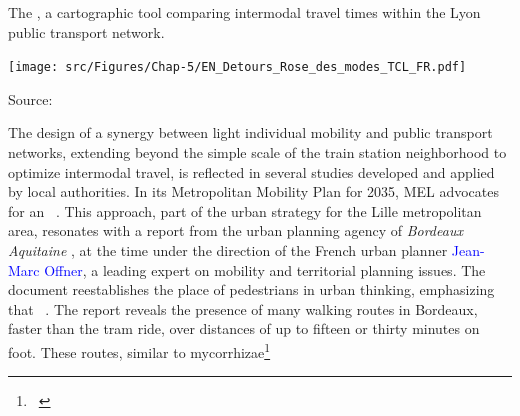 \begin{refsegment}
    \begin{carte}[h!]\vspace*{4pt}
        \caption{The , a cartographic tool comparing intermodal travel times within the Lyon public transport network.}
        \label{fig-chap5:rose-modes-reseau-tcl}
        \centerline{\texttt{[image: src/Figures/Chap-5/EN\_Detours\_Rose\_des\_modes\_TCL\_FR.pdf]}}
        \vspace{5pt}
        \begin{flushright}\scriptsize{
        Source: \textcolor{blue}{\textcite{tcl_transports_2023}}
        }\end{flushright}
    \end{carte}
    
The design of a synergy between light individual mobility and public transport networks, extending beyond the simple scale of the train station neighborhood to optimize intermodal travel, is reflected in several studies developed and applied by local authorities. In its Metropolitan Mobility Plan for 2035, \acrshort{MEL} advocates for an ~\textcolor{blue}{\autocite[328]{conseil_de_developpement_de_la_mel_plan_2022}}. This approach, part of the urban strategy for the Lille metropolitan area, resonates with a report from the urban planning agency of \textsl{Bordeaux Aquitaine} \textcolor{blue}{\textcite{aurba_itineraires_2017}}, at the time under the direction of the French urban planner \textcolor{blue}{Jean-Marc Offner}, a leading expert on mobility and territorial planning issues. The document reestablishes the place of pedestrians in urban thinking, emphasizing that ~\textcolor{blue}{\autocite[3, 14, 24]{aurba_itineraires_2017}}. The report reveals the presence of many walking routes in Bordeaux, faster than the tram ride, over distances of up to fifteen or thirty minutes on foot. These routes, similar to mycorrhizae\footnote{~
}
\end{refsegment}
